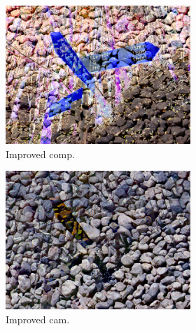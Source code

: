 \begin{figure}[]
\begin{subfigure}{\textwidth}
        \begin{subfigure}{0.24\textwidth}
            \centering
            \includegraphics[width=\textwidth]{images/04-experiment02/photo/pebbles/improved_im.jpg}
            \caption*{Improved comp.}
        \end{subfigure}
        \hfill
        \begin{subfigure}{0.24\textwidth}
            \centering
            \includegraphics[width=\textwidth]{images/04-experiment02/photo/pebbles/improved_proj.jpg}
            \caption*{Improved cam.}
        \end{subfigure}
        \hfill
        \begin{subfigure}{0.24\textwidth}
            \centering

\end{subfigure}
\end{subfigure}
\end{figure}
